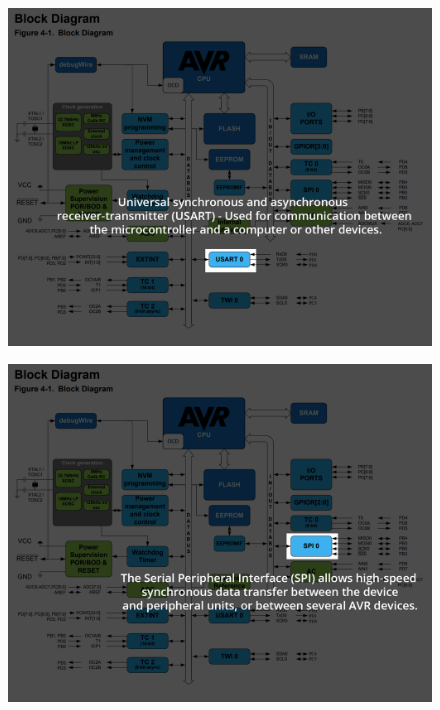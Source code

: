 \begin{frame}
	\begin{figure}
		\includegraphics[scale=.2]{assets/usart}  
	\end{figure}
\end{frame}

\begin{frame}
	\begin{figure}
		\includegraphics[scale=.2]{assets/spi}  
	\end{figure}
\end{frame}


